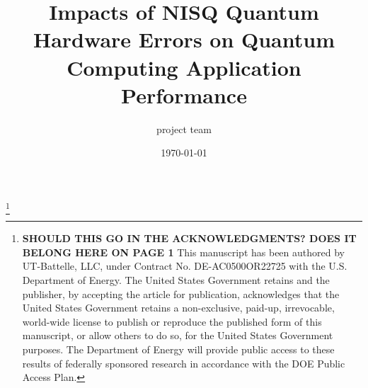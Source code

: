 \documentclass[aps,pra,reprint,showpacs,nofootinbib,superscriptaddress]{revtex4-1}
\begin{document}
\title {Impacts of NISQ Quantum Hardware Errors on Quantum Computing Application Performance}

%
{\footnote{ \textbf{SHOULD THIS GO IN THE ACKNOWLEDGMENTS? DOES IT BELONG HERE ON PAGE 1} This manuscript has been authored by UT-Battelle, LLC, under Contract No. DE-AC0500OR22725 with the U.S. Department of Energy. The United States Government retains and the publisher, by accepting the article for publication, acknowledges that the United States Government retains a non-exclusive, paid-up, irrevocable, world-wide license to publish or reproduce the published form of this manuscript, or allow others to do so, for the United States Government purposes. The Department of Energy will provide public access to these results of federally sponsored research in accordance with the DOE Public Access Plan.}}

\author{project team}








\date{\today}
\end{document}
